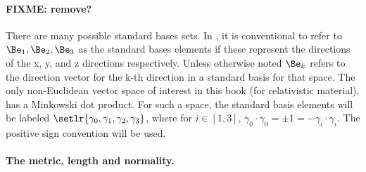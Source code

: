 
\paragraph{FIXME: remove?}
There are many possible standard bases sets.  In , it is conventional to refer to \( \Be_1, \Be_2, \Be_3 \) as the standard bases elements if these represent the directions of the x, y, and z directions respectively.  Unless otherwise noted \( \Be_k \) refers to the direction vector for the k-th direction in a standard basis for that space.
The only non-Euclidean vector space of interest in this book (for relativistic material), has a Minkowski dot product.  For such a space, the standard basis elements will be labeled \( \setlr{ \gamma_0, \gamma_1, \gamma_2, \gamma_3 } \), where for \( i \in [1,3] \), \( \gamma_0 \cdot \gamma_0 = \pm 1 = -\gamma_i \cdot \gamma_i \).  The positive sign convention will be used.

%

\paragraph{The metric, length and normality.}

